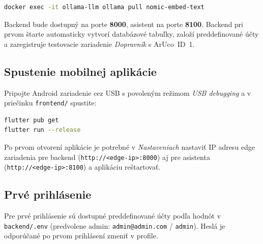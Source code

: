\begin{lstlisting}[style=code-listing, language=bash]
docker exec -it ollama-llm ollama pull nomic-embed-text
\end{lstlisting}

Backend bude dostupný na porte \textbf{8000}, asistent na porte \textbf{8100}. Backend pri prvom štarte automaticky vytvorí databázové tabuľky, založí preddefinované účty a zaregistruje testovacie zariadenie \emph{Dopravník} s ArUco~ID~1.

\subsection*{Spustenie mobilnej aplikácie}

Pripojte Android zariadenie cez USB s povoleným režimom \emph{USB debugging} a v priečinku \texttt{frontend/} spustite:

\begin{lstlisting}[style=code-listing, language=bash]
flutter pub get
flutter run --release
\end{lstlisting}

Po prvom otvorení aplikácie je potrebné v \emph{Nastaveniach} nastaviť IP adresu edge zariadenia pre backend (\texttt{http://<edge-ip>:8000}) aj pre asistenta (\texttt{http://<edge-ip>:8100}) a aplikáciu reštartovať.

\subsection*{Prvé prihlásenie}

Pre prvé prihlásenie sú dostupné preddefinované účty podľa hodnôt v \texttt{backend/.env} (predvolene admin: \texttt{admin@admin.com} / \texttt{admin}). Heslá je odporúčané po prvom prihlásení zmeniť v profile.
